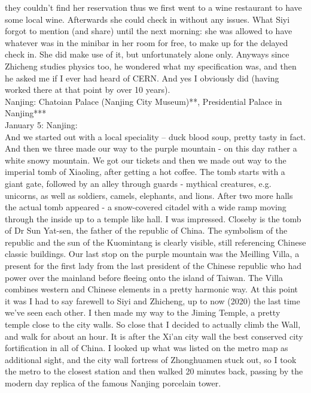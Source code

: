 they couldn't find her reservation thus we first went to a wine restaurant to have some local wine. Afterwards she could check in without any issues. What Siyi forgot to mention (and share) until the next morning: she was allowed to have whatever was in the minibar in her room for free, to make up for the delayed check in. She did make use of it, but unfortunately alone only. Anyways since Zhicheng studies physics too, he wondered what my specification was, and then he asked me if I ever had heard of CERN. And yes I obviously did (having worked there at that point by over 10 years).\\

Nanjing: Chatoian Palace (Nanjing City Museum)**, Presidential Palace in Nanjing***\\

January 5: Nanjing:\\
And we started out with a local speciality -- duck blood soup, pretty tasty in fact. And then we three made our way to the purple mountain - on this day rather a white snowy mountain. We got our tickets and then we made out way to the imperial tomb of Xiaoling, after getting a hot coffee. The tomb starts with a giant gate, followed by an alley through guards - mythical creatures, e.g. unicorns, as well as soldiers, camels, elephants, and lions. After two more halls the actual tomb appeared - a snow-covered citadel with a wide ramp moving through the inside up to a temple like hall. I was impressed. Closeby is the tomb of Dr Sun Yat-sen, the father of the republic of China. The symbolism of the republic and the sun of the Kuomintang is clearly visible, still referencing Chinese classic buildings. Our last stop on the purple mountain was the Meilling Villa, a present for the first lady from the last president of the Chinese republic who had power over the mainland before fleeing onto the island of Taiwan. The Villa combines western and Chinese elements in a pretty harmonic way. At this point it was I had to say farewell to Siyi and Zhicheng, up to now (2020) the last time we've seen each other. I then made my way to the Jiming Temple, a pretty temple close to the city walls. So close that I decided to actually climb the Wall, and walk for about an hour. It is after the Xi'an city wall the best conserved city fortification in all of China. I looked up what was listed on the metro map as additional sight, and the city wall fortress of Zhonghuamen stuck out, so I took the metro to the closest station and then walked 20 minutes back, passing by the modern day replica of the famous Nanjing porcelain tower. \\

